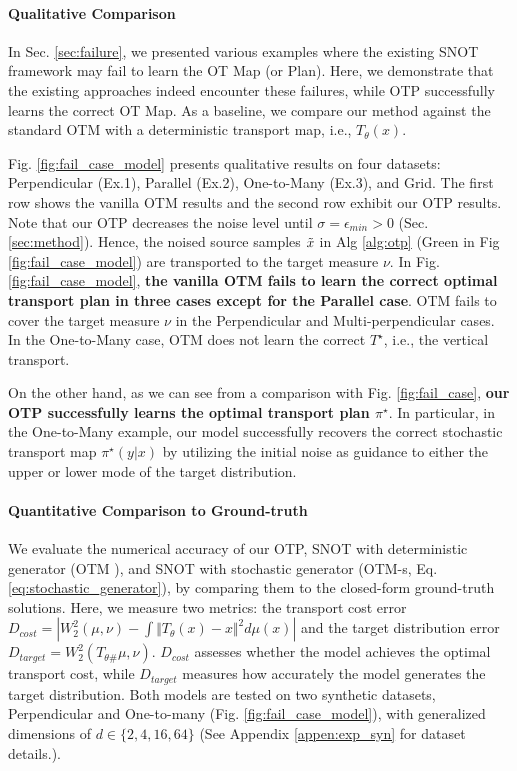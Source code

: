 \paragraph{Qualitative Comparison}
In Sec. \ref{sec:failure}, we presented various examples where the existing SNOT framework may fail to learn the OT Map (or Plan). Here, we demonstrate that the existing approaches indeed encounter these failures, while OTP successfully learns the correct OT Map. As a baseline, we compare our method against the standard OTM with a deterministic transport map, i.e., $T_{\theta}(x)$. 

Fig. \ref{fig:fail_case_model} presents qualitative results on four datasets: Perpendicular (Ex.1), Parallel (Ex.2), One-to-Many (Ex.3), and Grid. The first row shows the vanilla OTM results and the second row exhibit our OTP results. Note that our OTP decreases the noise level until $\sigma = \epsilon_{min} > 0$ (Sec. \ref{sec:method}). Hence, the noised source samples $\Tilde{x}$ in Alg \ref{alg:otp} (Green in Fig \ref{fig:fail_case_model}) are transported to the target measure $\nu$.
In Fig. \ref{fig:fail_case_model}, \textbf{the vanilla OTM fails to learn the correct optimal transport plan in three cases except for the Parallel case}. OTM fails to cover the target measure $\nu$ in the Perpendicular and Multi-perpendicular cases. In the One-to-Many case, OTM does not learn the correct $T^{\star}$, i.e., the vertical transport. 

On the other hand, as we can see from a comparison with Fig. \ref{fig:fail_case}, \textbf{our OTP successfully learns the optimal transport plan $\pi^{\star}$}. In particular, in the One-to-Many example, our model successfully recovers the correct stochastic transport map $\pi^{\star}(y | x)$ by utilizing the initial noise as guidance to either the upper or lower mode of the target distribution.

\vspace{-7pt}
\paragraph{Quantitative Comparison to Ground-truth}
We evaluate the numerical accuracy of our OTP, SNOT with deterministic generator (OTM \citep{otm}), and SNOT with stochastic generator (OTM-s, Eq. \ref{eq:stochastic_generator}), by comparing them to the closed-form ground-truth solutions. Here, we measure two metrics: the transport cost error $D_{cost} = | W^2_2 (\mu, \nu) - \int \Vert T_{\theta}(x) - x \Vert^2 d\mu(x) |$ and the target distribution error $D_{target} = W^2_2 (T_{\theta \#} \mu, \nu)$.
$D_{cost}$ assesses whether the model achieves the optimal transport cost, while $D_{target}$ measures how accurately the model generates the target distribution.
Both models are tested on two synthetic datasets, Perpendicular and One-to-many (Fig. \ref{fig:fail_case_model}), with generalized dimensions of $d \in \{ 2, 4, 16, 64 \}$ (See Appendix \ref{appen:exp_syn} for dataset details.). 

